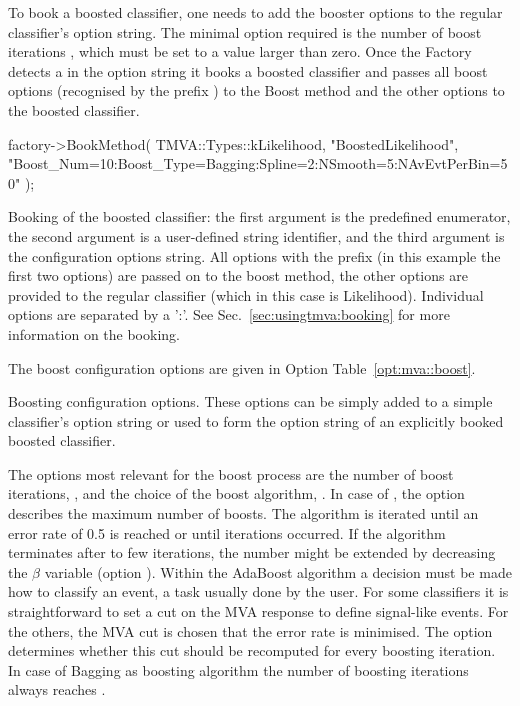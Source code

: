 To book a boosted classifier, one needs to add the booster options to
the regular classifier's option string. The minimal option required is
the number of boost iterations , which must be
set to a value larger than zero.  Once the Factory detects a
 in the option string it books a boosted classifier
and passes all boost options (recognised by the prefix ) to
the Boost method and the other options to the boosted classifier.
\begin{codeexample}
\begin{tmvacode}
factory->BookMethod( TMVA::Types::kLikelihood, "BoostedLikelihood",
       "Boost_Num=10:Boost_Type=Bagging:Spline=2:NSmooth=5:NAvEvtPerBin=50" );
\end{tmvacode}
\caption[.]{\codeexampleCaptionSize Booking of the boosted classifier: 
         the first argument is the predefined enumerator, the 
         second argument is a user-defined string identifier, and the third 
         argument is the configuration options string. All options with the 
         prefix  (in this example the first two options) are 
         passed on to the boost method, the other options are provided to the 
         regular classifier (which in this case is Likelihood). Individual 
         options are separated by a ':'. See Sec.~\ref{sec:usingtmva:booking} 
         for more information on the booking. 
}
\end{codeexample}

The boost configuration options are given in Option 
Table~\ref{opt:mva::boost}.

\begin{option}[!t]

\caption[.]{\optionCaptionSize Boosting configuration options. These
  options can be simply added to a simple classifier's option string
  or used to form the option string of an explicitly booked boosted
  classifier.}
\label{opt:mva::boost}
\end{option}

The options most relevant for the boost process are the number of boost
iterations, , and the choice of the boost algorithm,
.  In case of , the option
 describes the maximum number of boosts. The algorithm
is iterated until an error rate of 0.5 is reached or until
 iterations occurred. If the algorithm terminates after
to few iterations, the number might be extended by decreasing the
$\beta$ variable (option ).  Within the
AdaBoost algorithm a decision must be made how to classify an event, a
task usually done by the user. For some classifiers it is straightforward to
set a cut on the MVA response to define signal-like events. For the others, 
the MVA cut is chosen that the error rate is minimised. The option  
determines whether this cut should be recomputed for every boosting iteration.
In case of Bagging as boosting algorithm the number of boosting
iterations always reaches .

